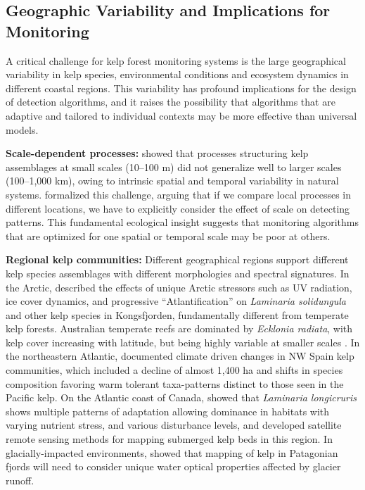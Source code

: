 \documentclass[12pt,oneside]{book}
\begin{document}
\subsection{Geographic Variability and Implications for Monitoring}
\label{subsec:geographic-variability}

A critical challenge for kelp forest monitoring systems is the large geographical variability in kelp species, environmental conditions and ecosystem dynamics in different coastal regions. This variability has profound implications for the design of detection algorithms, and it raises the possibility that algorithms that are adaptive and tailored to individual contexts may be more effective than universal models.

\textbf{Scale-dependent processes:} \citet{Marzinelli2015} showed that processes structuring kelp assemblages at small scales (10--100 m) did not generalize well to larger scales (100--1,000 km), owing to intrinsic spatial and temporal variability in natural systems. \citet{UnderwoodPetraitis1993} formalized this challenge, arguing that if we compare local processes in different locations, we have to explicitly consider the effect of scale on detecting patterns. This fundamental ecological insight suggests that monitoring algorithms that are optimized for one spatial or temporal scale may be poor at others.

\textbf{Regional kelp communities:} Different geographical regions support different kelp species assemblages with different morphologies and spectral signatures. In the Arctic, \citet{Bischof2019} described the effects of unique Arctic stressors such as UV radiation, ice cover dynamics, and progressive ``Atlantification'' on \textit{Laminaria solidungula} and other kelp species in Kongsfjorden, fundamentally different from temperate kelp forests. Australian temperate reefs are dominated by \textit{Ecklonia radiata}, with kelp cover increasing with latitude, but being highly variable at smaller scales \citep{Marzinelli2015, ConnellIrving2008}. In the northeastern Atlantic, \citet{Voerman2013} documented climate driven changes in NW Spain kelp communities, which included a decline of almost 1,400 ha and shifts in species composition favoring warm tolerant taxa-patterns distinct to those seen in the Pacific kelp. On the Atlantic coast of Canada, \citet{JohnsonMann1988} showed that \textit{Laminaria longicruris} shows multiple patterns of adaptation allowing dominance in habitats with varying nutrient stress, and various disturbance levels, and \citet{SimmsDubois2001} developed satellite remote sensing methods for mapping submerged kelp beds in this region. In glacially-impacted environments, \citet{Huovinen2020} showed that mapping of kelp in Patagonian fjords will need to consider unique water optical properties affected by glacier runoff.
\end{document}
